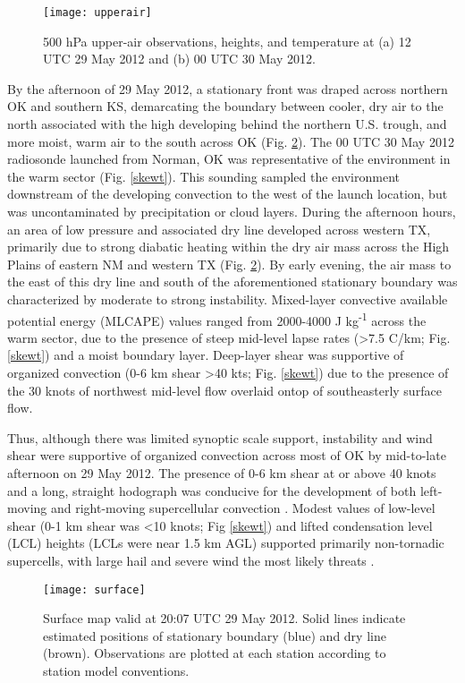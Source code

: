 \begin{figure}
\centering
\texttt{[image: upperair]}
\caption{500 hPa upper-air observations, heights, and temperature at (a) 12 UTC 29 May 2012 and (b) 00 UTC 30 May 2012.}
\label{upper}
\end{figure}

By the afternoon of 29 May 2012, a stationary front was draped across northern OK and southern KS, demarcating the boundary between cooler, dry air to the north associated with the high developing behind the northern U.S. trough, and more moist, warm air to the south across OK (Fig. \ref{surface}).  The 00 UTC 30 May 2012 radiosonde launched from Norman, OK was representative of the environment in the warm sector (Fig. \ref{skewt}). This sounding sampled the environment downstream of the developing convection to the west of the launch location, but was uncontaminated by precipitation or cloud layers. During the afternoon hours, an area of low pressure and associated dry line developed across western TX, primarily due to strong diabatic heating within the dry air mass across the High Plains of eastern NM and western TX (Fig. \ref{surface}). By early evening, the air mass to the east of this dry line and south of the aforementioned stationary boundary was characterized by moderate to strong instability. Mixed-layer convective available potential energy (MLCAPE) values ranged from 2000-4000 J kg\textsuperscript{-1} across the warm sector, due to the presence of steep mid-level lapse rates (\textgreater 7.5 C/km; Fig. \ref{skewt}) and a moist boundary layer. Deep-layer shear was supportive of organized convection (0-6 km shear \textgreater 40 kts; Fig. \ref{skewt}) due to the presence of the 30 knots of northwest mid-level flow overlaid ontop of southeasterly surface flow.

Thus, although there was limited synoptic scale support, instability and wind shear were supportive of organized convection across most of OK by mid-to-late afternoon on 29 May 2012.  The presence of 0-6 km shear at or above 40 knots and a long, straight hodograph was conducive for the development of both left-moving and right-moving supercellular convection \citep{klempwilhelmson78}. Modest values of low-level shear (0-1 km shear was \textless 10 knots; Fig \ref{skewt}) and lifted condensation level (LCL) heights (LCLs were near 1.5 km AGL) supported primarily non-tornadic supercells, with large hail and severe wind the most likely threats \citep{thompsonetal03}.

\begin{figure}
\centering
\texttt{[image: surface]}
\caption{Surface map valid at 20:07 UTC 29 May 2012. Solid lines indicate estimated positions of stationary boundary (blue) and dry line (brown). Observations are plotted at each station according to station model conventions.}
\label{surface}
\end{figure}

